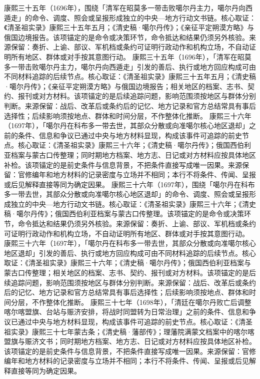 康熙三十五年（1696年），围绕「清军在昭莫多一带击败噶尔丹主力，噶尔丹向西遁走」的命令、调度、照会或呈报形成独立的中央—地方行动文书链。核心取证：《清圣祖实录》康熙三十五年五月；《清史稿·噶尔丹传》；《亲征平定朔漠方略》与俄国边境报告。该项锚定的是命令或决策环节，命令抵达和结果仍须另外核验。来源保留：奏折、上谕、部议、军机档或条约可证明行政动作和机构立场，不自动证明所有地区、群体或对手按其意图行动。
康熙三十五年（1696年），「清军在昭莫多一带击败噶尔丹主力，噶尔丹向西遁走」引发的善后、执行或地方回应构成可由不同材料追踪的后续节点。核心取证：《清圣祖实录》康熙三十五年五月；《清史稿·噶尔丹传》；《亲征平定朔漠方略》与俄国边境报告；相关地区的档案、志书、契约、报刊或对方材料。该项锚定的是后续追踪问题，影响范围须按地区与群体分别判断。来源保留：战后、改革后或条约后的记忆、地方记录和官方总结常具有事后选择性；后续影响须按地点、群体和时间分层，不作整体化推断。
康熙三十六年（1697年），「噶尔丹在科布多一带去世，其部众分散或向准噶尔核心地区退却」之前的条件、信息和争议已通过中央与地方材料显现，构成该事件可追踪的前史节点。核心取证：《清圣祖实录》康熙三十六年；《清史稿·噶尔丹传》；俄国西伯利亚档案与蒙古口传整理；同时期地方档案、地方志、日记或对方材料应按具体地区补检。该项锚定的是前史条件与信息背景，不把条件直接写成唯一因果。来源保留：官修编年和地方材料的记录密度与立场并不相同；本行不将条件、传闻、呈报或后见解释直接等同为确定因果。
康熙三十六年（1697年），围绕「噶尔丹在科布多一带去世，其部众分散或向准噶尔核心地区退却」的命令、调度、照会或呈报形成独立的中央—地方行动文书链。核心取证：《清圣祖实录》康熙三十六年；《清史稿·噶尔丹传》；俄国西伯利亚档案与蒙古口传整理。该项锚定的是命令或决策环节，命令抵达和结果仍须另外核验。来源保留：奏折、上谕、部议、军机档或条约可证明行政动作和机构立场，不自动证明所有地区、群体或对手按其意图行动。
康熙三十六年（1697年），「噶尔丹在科布多一带去世，其部众分散或向准噶尔核心地区退却」引发的善后、执行或地方回应构成可由不同材料追踪的后续节点。核心取证：《清圣祖实录》康熙三十六年；《清史稿·噶尔丹传》；俄国西伯利亚档案与蒙古口传整理；相关地区的档案、志书、契约、报刊或对方材料。该项锚定的是后续追踪问题，影响范围须按地区与群体分别判断。来源保留：战后、改革后或条约后的记忆、地方记录和官方总结常具有事后选择性；后续影响须按地点、群体和时间分层，不作整体化推断。
康熙三十七年（1698年），「清廷在噶尔丹败亡后调整喀尔喀盟旗、台站与赈济安排，将战时同盟转为日常治理」之前的条件、信息和争议已通过中央与地方材料显现，构成该事件可追踪的前史节点。核心取证：《清圣祖实录》康熙三十七年蒙古条；《清史稿·藩部传》；理藩院满蒙文档案中的喀尔喀盟旗与赈济文书；同时期地方档案、地方志、日记或对方材料应按具体地区补检。该项锚定的是前史条件与信息背景，不把条件直接写成唯一因果。来源保留：官修编年和地方材料的记录密度与立场并不相同；本行不将条件、传闻、呈报或后见解释直接等同为确定因果。

